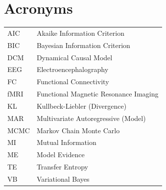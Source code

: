 \documentclass[a4paper,10pt]{article}
\begin{document}
\section{Acronyms}

\begin{tabular}{l l}
        AIC     &       Akaike Information Criterion \\
        BIC     &       Bayesian Information Criterion \\
	DCM	&	Dynamical Causal Model\\
	EEG	&	Electroencephalography\\
	FC	&	Functional Connectivity\\
	fMRI	&	Functional Magnetic Resonance Imaging\\
	KL	&	Kullbeck-Liebler (Divergence)\\
	MAR	&	Multivariate Autoregressive (Model)\\
	MCMC &  Markov Chain Monte Carlo\\
	MI	&	Mutual Information\\
	ME	&	Model Evidence\\
	TE	&	Transfer Entropy\\
	VB  &   Variational Bayes
\end{tabular}

\printbibliography
\end{document}

